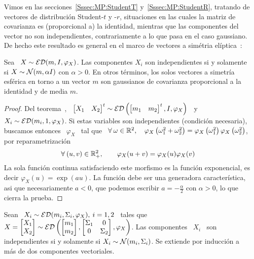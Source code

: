 Vimos   en   las  secciones~\ref{Sssec:MP:StudentT}   y~\ref{Sssec:MP:StudentR},
tratando de  vectores de distribuci\'on  Student-$t$ y -$r$, situaciones  en las
cuales la  matriz de covarianza es  (proporcional a) la  identidad, mientras que
las componentes del  vector no son independientes, contrariamente  a lo que pasa
en  el caso  gaussiano.   De hecho  este resultado  es  general en  el marco  de
vectores a sim\'etria el\'iptica~\cite{BilBre99, Max67}:
%
\begin{teorema}
\label{Teo:MP:MaxwellHershell}
%
  Sea \ $X \sim \mathcal{ED}(m,I,\varphi_X)$. Las componentes $X_i$ son independientes si
  y solamente si $X  \sim \mathcal{N}(m, \alpha I)$ con $\alpha >  0$. En otros t\'erminos,
  los  solos vectores  a simetr\'ia  esf\'erica  en torno  a un  vector $m$  son
  gaussianos de covarianza proporcional a la identidad y de media $m$.
\end{teorema}
%
\begin{proof}
  Del teorema~\cite{Teo:MP:TranformacionAfinEliptica},  \ $\begin{bmatrix} X_1 &
    X_2    \end{bmatrix}^t     \sim    \mathcal{ED}\left(    \begin{bmatrix}     m_1    &
      m_2 \end{bmatrix}^t, I, \varphi_X \right)$ \ y  \ $X_i \sim \mathcal{ED}( m_i , 1 ,
  \varphi_X)$.  Si  estas variables son  independientes (condici\'on necesaria),
  buscamos entonces  \ $\varphi_X$ \ tal  que \ $\forall \:  \omega \in \mathbb{R}^2,
  \quad  \varphi_X\left(  \omega_1^2  +  \omega_2^2  \right)  =  \varphi_X\left(
    \omega_1^2   \right)   \varphi_X\left(    \omega_2^2   \right)$,   \ie   por
  reparametrizaci\'on
  \[
  \forall  \:   (u,v)  \in  \mathbb{R}_+^2,  \qquad   \varphi_X(u+v)  =  \varphi_X(u)
  \varphi_X(v)
  \]
  La  sola  funci\'on  continua  satisfaciendo  este morfismo  es  la  funci\'on
  exponencial, es decir  $\varphi_X(u) = \exp(a u)$.  La  funci\'on debe ser una
  generadora  caracter\'istica, asi  que  necesariamente $a  <  0$, que  podemos
  escribir $a = - \frac{\alpha}{2}$ con $\alpha > 0$, lo que cierra la prueba.
\end{proof}
%
\begin{corolario}%
\label{Cor:MP:MaxwellHershell}
%
Sean \ $X_i \sim \mathcal{ED}( m_i , \Sigma_i , \varphi_X), \: i = 1, 2$ \ tales que \ $X
=  \begin{bmatrix} X_1\\X_2 \end{bmatrix}  \sim \mathcal{ED}\left(  \begin{bmatrix} m_1\\
    m_2   \end{bmatrix}    ,   \begin{bmatrix}   \Sigma_1    &   0   \\    0   &
    \Sigma_2 \end{bmatrix} , \varphi_X \right)$.   Las componentes \ $X_i$ \ son
independientes si y solamente si $X_i  \sim \mathcal{N}(m_i , \Sigma_i)$. Se extiende por
inducci\'on a m\'as de dos componentes vectoriales.
\end{corolario}

